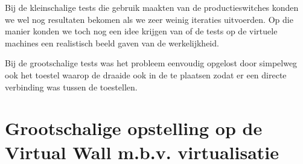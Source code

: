 Bij de kleinschalige tests die gebruik maakten van de productieswitches konden we wel nog resultaten bekomen als we zeer weinig iteraties uitvoerden.
Op die manier konden we toch nog een idee krijgen van of de tests op de virtuele machines een realistisch beeld gaven van de werkelijkheid.

Bij de grootschalige tests was het probleem eenvoudig opgelost door simpelweg ook het toestel waarop de \nwmretriever{} draaide ook in de \vwall{} te plaatsen
zodat er een directe verbinding was tussen de toestellen.


\section{Grootschalige opstelling op de Virtual Wall m.b.v. virtualisatie}
\label{probleem-virtualisatie-vwall}

